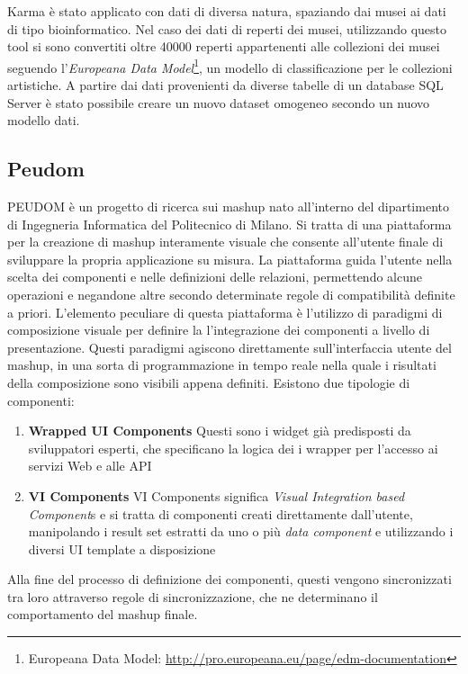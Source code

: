 Karma è stato applicato con dati di diversa natura, spaziando dai musei ai dati di tipo bioinformatico. 
Nel caso dei dati di reperti dei musei, utilizzando questo tool si sono convertiti oltre 40000 reperti appartenenti alle collezioni dei musei seguendo l'\emph{Europeana Data Model}\footnote{Europeana Data Model: \url{http://pro.europeana.eu/page/edm-documentation}}, un modello di classificazione per le collezioni artistiche. A partire dai dati provenienti da diverse tabelle di un database SQL Server è stato possibile creare un nuovo dataset omogeneo secondo un nuovo modello dati. 

\subsection*{Peudom}

PEUDOM \cite{Cappiello:2015:UAE:2788341.2735632} è un progetto di ricerca sui mashup nato all'interno del dipartimento di Ingegneria Informatica del Politecnico di Milano. Si tratta di una piattaforma per la creazione di mashup interamente visuale che consente all'utente finale di sviluppare la propria applicazione su misura. La piattaforma guida l'utente nella scelta dei componenti e nelle definizioni delle relazioni, permettendo alcune operazioni e negandone altre secondo determinate regole di compatibilità definite a priori.
L'elemento peculiare di questa piattaforma è l'utilizzo di paradigmi di composizione visuale per definire la l'integrazione dei componenti a livello di presentazione. Questi paradigmi agiscono direttamente sull'interfaccia utente del mashup, in una sorta di programmazione in tempo reale nella quale i risultati della composizione sono visibili appena definiti.
Esistono due tipologie di componenti: 
\begin{enumerate}
	\item \textbf{Wrapped UI Components}
	Questi sono i widget già predisposti da sviluppatori esperti, che specificano la logica dei i wrapper per l'accesso ai servizi Web e alle API
	\item \textbf{VI Components}
	VI Components significa \emph{Visual Integration based Component}s e si tratta di componenti creati direttamente dall'utente, manipolando i result set estratti da uno o più \emph{data component} e utilizzando i diversi UI template a disposizione
\end{enumerate}
Alla fine del processo di definizione dei componenti, questi vengono sincronizzati tra loro attraverso regole di sincronizzazione, che ne determinano il comportamento del mashup finale.

